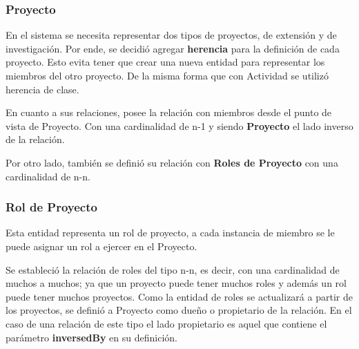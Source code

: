 \subsubsection{Proyecto}%
\label{ssub:modelo_proyecto}
En el sistema se necesita representar dos tipos de proyectos, de extensión y de investigación\@. Por ende, se decidió agregar \textbf{herencia} para la definición
de cada proyecto\@. Esto evita tener que crear una nueva entidad para representar los miembros del otro proyecto\@. De la misma forma que con Actividad se utilizó
herencia de clase.


En cuanto a sus relaciones, posee la relación con miembros desde el punto de vista de Proyecto. Con una cardinalidad de n-1 y siendo \textbf{Proyecto} el lado
inverso de la relación.

Por otro lado, también se definió su relación con \textbf{Roles de Proyecto} con una cardinalidad de n-n.

\subsubsection{Rol de Proyecto}%
\label{ssub:rol_de_proyecto_modelo}
Esta entidad representa un rol de proyecto, a cada instancia de miembro se le puede asignar un rol a ejercer en el Proyecto.

Se estableció la relación de roles del tipo n-n, es decir, con una cardinalidad de muchos a muchos; ya que un proyecto puede tener muchos roles y además
un rol puede tener muchos proyectos\@. Como la entidad de roles se actualizará a partir de los proyectos, se definió a Proyecto como dueño o propietario de
la relación. En el caso de una relación de este tipo el lado propietario es aquel que contiene el parámetro \textbf{inversedBy} en
su definición.~\parencite{doctrine-inheritance}
